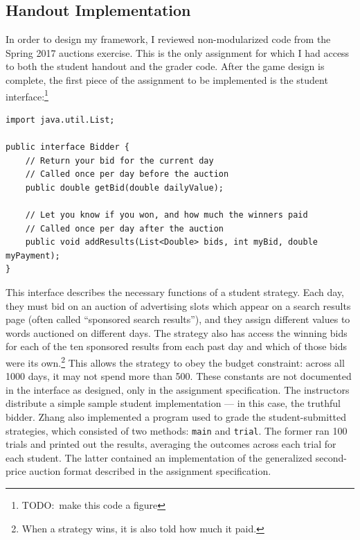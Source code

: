 \documentclass[pageno]{jpaper}
\begin{document}
\subsection*{Handout Implementation}
In order to design my framework, I reviewed non-modularized code from the Spring 2017 auctions exercise.
This is the only assignment for which I had access to both the student handout and the grader code.
After the game design is complete, the first piece of the assignment to be implemented is the student interface:\footnote{TODO:\ make this code a figure}
\begin{verbatim}
import java.util.List;

public interface Bidder {
    // Return your bid for the current day
    // Called once per day before the auction
    public double getBid(double dailyValue);

    // Let you know if you won, and how much the winners paid
    // Called once per day after the auction
    public void addResults(List<Double> bids, int myBid, double myPayment);
}
\end{verbatim}
This interface describes the necessary functions of a student strategy.
Each day, they must bid on an auction of advertising slots which appear on a search results page (often called ``sponsored search results''), and they assign different values to words auctioned on different days.
The strategy also has access the winning bids for each of the ten sponsored results from each past day and which of those bids were its own.\footnote{When a strategy wins, it is also told how much it paid.}
This allows the strategy to obey the budget constraint: across all 1000 days, it may not spend more than 500.
These constants are not documented in the interface as designed, only in the assignment specification.
The instructors distribute a simple sample student implementation --- in this case, the truthful bidder.
Zhang also implemented a program used to grade the student-submitted strategies, which consisted of two methods: \texttt{main} and \texttt{trial}.
The former ran 100 trials and printed out the results, averaging the outcomes across each trial for each student.
The latter contained an implementation of the generalized second-price auction format described in the assignment specification.
\end{document}
